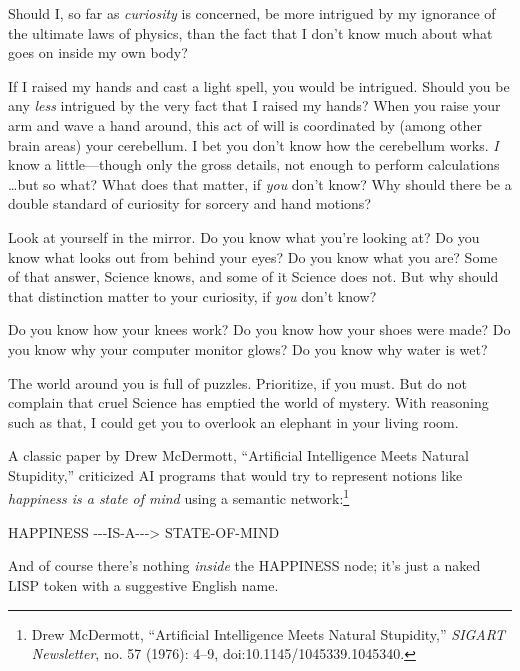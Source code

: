 {
 Should I, so far as \textit{curiosity} is concerned, be more
intrigued by my ignorance of the ultimate laws of physics, than the
fact that I don't know much about what goes on inside
my own body?}

{
 If I raised my hands and cast a light spell, you would be
intrigued. Should you be any \textit{less} intrigued by the very fact
that I raised my hands? When you raise your arm and wave a hand around,
this act of will is coordinated by (among other brain areas) your
cerebellum. I bet you don't know how the cerebellum
works. \textit{I} know a little---though only the gross details, not
enough to perform calculations \ldots but so what? What does that
matter, if \textit{you} don't know? Why should there be
a double standard of curiosity for sorcery and hand motions?}

{
 Look at yourself in the mirror. Do you know what
you're looking at? Do you know what looks out from
behind your eyes? Do you know what you are? Some of that answer,
Science knows, and some of it Science does not. But why should that
distinction matter to your curiosity, if \textit{you}
don't know?}

{
 Do you know how your knees work? Do you know how your shoes were
made? Do you know why your computer monitor glows? Do you know why
water is wet?}

{
 The world around you is full of puzzles. Prioritize, if you must.
But do not complain that cruel Science has emptied the world of
mystery. With reasoning such as that, I could get you to overlook an
elephant in your living room.}

\myendsectiontext

\label{truly_part_of_you}

{
 A classic paper by Drew McDermott, ``Artificial
Intelligence Meets Natural Stupidity,'' criticized AI
programs that would try to represent notions like \textit{happiness is
a state of mind} using a semantic network:\footnote{Drew McDermott, ``Artificial Intelligence
Meets Natural Stupidity,'' \textit{SIGART
Newsletter}, no. 57 (1976): 4--9, doi:10.1145/1045339.1045340.}}

\begin{center}
 HAPPINESS -{}-{}-IS-A-{}-{}-{\textgreater} STATE-OF-MIND
\end{center}

{
 And of course there's nothing \textit{inside} the
HAPPINESS node; it's just a naked LISP token with a
suggestive English name.}

